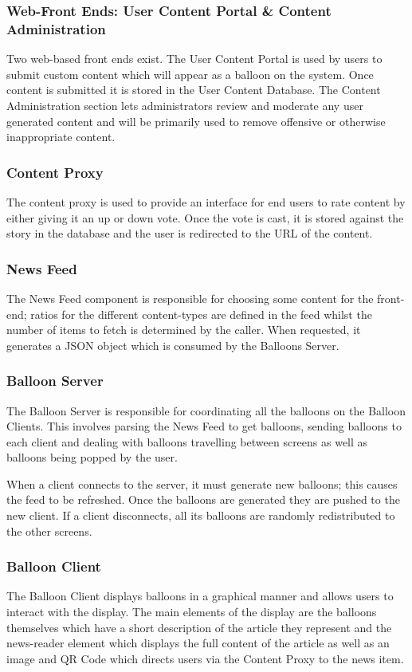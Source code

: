 \subsubsection{Web-Front Ends: User Content Portal \& Content Administration}
Two web-based front ends exist. The User Content Portal is used by users to 
submit custom content which will appear as a balloon on the system. Once 
content is submitted it is stored in the User Content Database. The Content
Administration section lets administrators review and moderate any user 
generated content and will be primarily used to remove offensive or otherwise
inappropriate content.

\subsubsection{Content Proxy}
The content proxy is used to provide an interface for end users to rate content
by either giving it an up or down vote. Once the vote is cast, it is stored
against the story in the database and the user is redirected to the URL of the
content.

\subsubsection{News Feed}
The News Feed component is responsible for choosing some content for the 
front-end; ratios for the different content-types are defined in the feed 
whilst the number of items to fetch is determined by the caller. When 
requested, it generates a JSON object which is consumed by the Balloons Server.

\subsubsection{Balloon Server}
The Balloon Server is responsible for coordinating all the balloons on the 
Balloon Clients. This involves parsing the News Feed to get balloons, sending
balloons to each client and dealing with balloons travelling between screens 
as well as balloons being popped by the user. 

When a client connects to the server, it must generate new balloons; this 
causes the feed to be refreshed. Once the balloons are generated they are 
pushed to the new client. If a client disconnects, all its balloons are 
randomly redistributed to the other screens.

\subsubsection{Balloon Client}
The Balloon Client displays balloons in a graphical manner and allows users to
interact with the display. The main elements of the display are the balloons 
themselves which have a short description of the article they represent and the
news-reader element which displays the full content of the article as well as
an image and QR Code which directs users via the Content Proxy to the news item.

%
